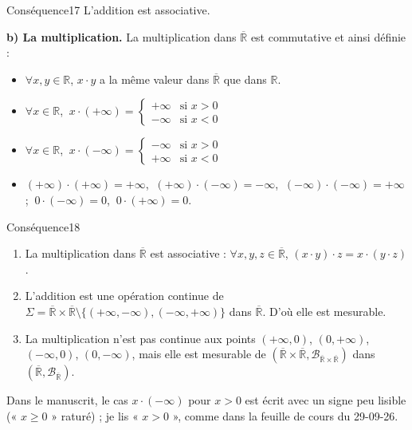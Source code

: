 \documentclass[11pt,a4paper]{article}
\newcommand{\R}{\mathbb{R}}
\newcommand{\Rb}{\overline{\mathbb{R}}}
\newcommand{\B}{\mathscr{B}}
\begin{document}
\begin{enonce}{Conséquence}{17}
L'addition est associative.
\end{enonce}

\textbf{b) La multiplication.} La multiplication dans $\Rb$ est commutative et ainsi définie :
\begin{itemize}[leftmargin=1.2cm]
  \item $\forall x,y\in\R$, $x\cdot y$ a la même valeur dans $\Rb$ que dans $\R$.
  \item $\forall x\in\R$, $\ x\cdot(+\infty)=\begin{cases}+\infty&\text{si }x>0\\-\infty&\text{si }x<0\end{cases}$
  \item $\forall x\in\R$, $\ x\cdot(-\infty)=\begin{cases}-\infty&\text{si }x>0\\+\infty&\text{si }x<0\end{cases}$
  \item $(+\infty)\cdot(+\infty)=+\infty$, $\ (+\infty)\cdot(-\infty)=-\infty$, $\ (-\infty)\cdot(-\infty)=+\infty$ ;
        $\ 0\cdot(-\infty)=0$, $\ 0\cdot(+\infty)=0$.
\end{itemize}

\begin{enonce}{Conséquence}{18}
\begin{enumerate}[label=\textbf{\roman*)},leftmargin=1.2cm]
  \item La multiplication dans $\Rb$ est associative : $\forall x,y,z\in\Rb$, $(x\cdot y)\cdot z=x\cdot(y\cdot z)$.
  \item L'addition est une opération continue de $\Sigma=\Rb\times\Rb\setminus\{(+\infty,-\infty),(-\infty,+\infty)\}$ dans $\Rb$.
        D'où elle est mesurable.
  \item La multiplication n'est pas continue aux points $(+\infty,0)$, $(0,+\infty)$, $(-\infty,0)$, $(0,-\infty)$, mais elle est
        mesurable de $(\Rb\times\Rb,\B_{\Rb\times\Rb})$ dans $(\Rb,\B_{\Rb})$.
\end{enumerate}
\end{enonce}

\begin{note}
Dans le manuscrit, le cas $x\cdot(-\infty)$ pour $x>0$ est écrit avec un signe peu lisible (« $x\ge0$ » raturé) ; je lis « $x>0$ »,
comme dans la feuille de cours du 29-09-26.
\end{note}

\end{document}
